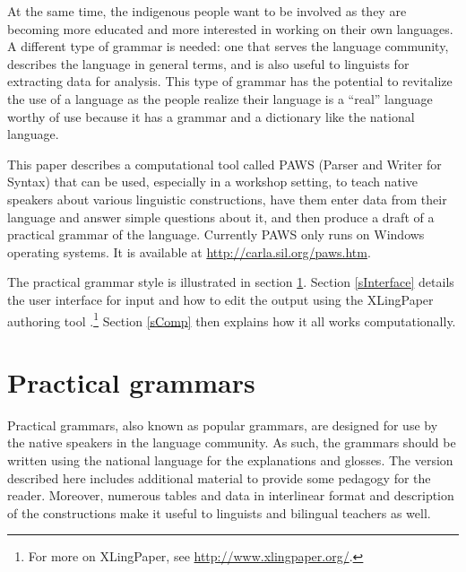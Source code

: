 At the same time, the indigenous people want to be involved as they are becoming more educated and more interested in working on their own languages. A different type of grammar is needed: one that serves the language community, describes the language in general terms, and is also useful to linguists for extracting data for analysis. This type of grammar has the potential to revitalize the use of a language as the people realize their language is a ``real'' language worthy of use because it has a grammar and a dictionary like the national language.

This paper describes a computational tool called {PAWS} (Parser and Writer for Syntax) that can be used, especially in a workshop setting, to teach native speakers about various linguistic constructions, have them enter data from their language and answer simple questions about it, and then produce a draft of a practical grammar of the language. Currently {PAWS} only runs on Windows operating systems. It is available at \url{http://carla.sil.org/paws.htm}.

The practical grammar style is illustrated in section \ref{sPractical}. Section \ref{sInterface} details the user interface for input and how to edit the output using the XLingPaper authoring tool \citep{rXLingPaper}.\footnote{\label{nXLingPaper}
   For more on XLingPaper, see \url{http://www.xlingpaper.org/}.
} 
Section \ref{sComp} then explains how it all works computationally.

\section{Practical grammars}\label{sPractical}
Practical grammars, also known as popular grammars, are designed for use by the native speakers in the language community. As such, the grammars should be written using the national language for the explanations and glosses. The version described here includes additional material to provide some pedagogy for the reader. Moreover, numerous tables and data in interlinear format and description of the constructions make it useful to linguists and bilingual teachers as well.


